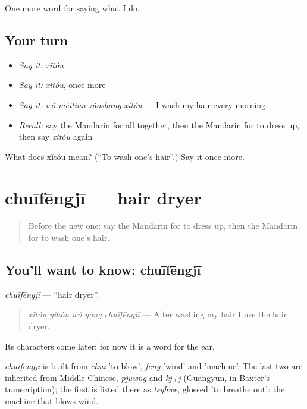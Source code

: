 \begin{grammarlens}[title={What you've built}]
One more word for saying what I do.
\end{grammarlens}

\subsection*{Your turn}
\begin{itemize}
\raggedright
  \item \emph{Say it:} \emph{xǐtóu}
  \item \emph{Say it:} \emph{xǐtóu}, once more
  \item \emph{Say it:} \emph{wǒ měitiān zǎoshang xǐtóu} — I wash my hair every morning.
  \item \emph{Recall:} say the Mandarin for all together, then the Mandarin for to dress up, then say \emph{xǐtóu} again
\end{itemize}

\begin{tcolorbox}[breakable,colback=teal!4,colframe=teal!35!black,title={Before you move on}]
What does xǐtóu mean? (\textquotedblleft{}To wash one's hair\textquotedblright{}.) Say it once more.
\end{tcolorbox}
\section[chuīfēngjī]{chuīfēngjī — hair dryer}

\label{lesson:ZH-C164-chuifengji}



\begin{quote}
Before the new one: say the Mandarin for to dress up, then the Mandarin for to wash one's hair.
\end{quote}

\subsection*{You'll want to know: chuīfēngjī}
\emph{chuīfēngjī} — \textquotedblleft{}hair dryer\textquotedblright{}.

\begin{quote}
\emph{xǐtóu yǐhòu wǒ yòng chuīfēngjī} — After washing my hair I use the hair dryer.
\end{quote}

Its characters come later; for now it is a word for the ear.

\begin{cousinweb}
\emph{chuīfēngjī} is built from \emph{chuī} 'to blow', \emph{fēng} 'wind' and  'machine'. The last two are inherited from Middle Chinese, \emph{pjuwng} and \emph{kj+j} (Guangyun, in Baxter's transcription); the first is listed there as \emph{tsyhwe}, glossed 'to breathe out': the machine that blows wind.
\end{cousinweb}

